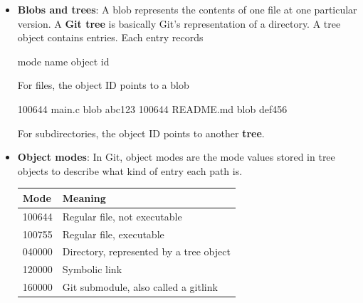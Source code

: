 \documentclass{report}
\begin{document}
\begin{itemize}
\begin{bashcode}
                message
                timestamp
            \end{bashcode}
            \bigbreak \noindent 
            If any of that changes, the commit hash changes. So when you “amend” a commit, Git does not actually edit the old commit. It creates a new commit object.
        \item \textbf{Blobs and trees}: A blob represents the contents of one file at one particular version.
            \bigbreak \noindent 
            A \textbf{Git tree} is basically Git's representation of a directory. A  tree object contains entries. Each entry records
            \begin{center}
                mode \qquad name \qquad object id
            \end{center}
            For files, the object ID points to a blob
            \begin{center}
                100644      \qquad main.c      \qquad blob abc123
                100644      \qquad README.md   \qquad blob def456
            \end{center}
            For subdirectories, the object ID points to another \textbf{tree}.
        \item \textbf{Object modes}: In Git, object modes are the mode values stored in tree objects to describe what kind of entry each path is.
            \begin{center}
                \begin{tabularx}{\textwidth}{@{}XX@{}}
                    \toprule
                    \textbf{Mode} &	\textbf{Meaning} \\
                    \midrule
                    100644	&Regular file, not executable\\[2ex]
                    100755	&Regular file, executable\\[2ex]
                    040000	&Directory, represented by a tree object\\[2ex]
                    120000	&Symbolic link\\[2ex]
                    160000	&Git submodule, also called a gitlink \\
                    \bottomrule
                \end{tabularx}
            \end{center}


\end{itemize}
\end{document}
